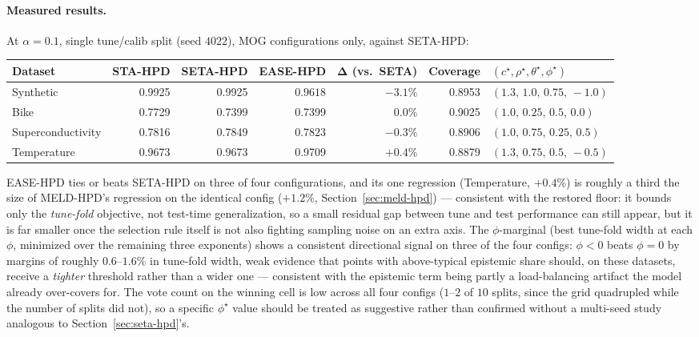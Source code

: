 \documentclass[11pt]{article}
\begin{document}
\paragraph{Measured results.} At $\alpha=0.1$, single tune/calib split (seed $4022$), MOG
configurations only, against SETA-HPD:

\begin{center}
\begin{tabular}{@{}lrrrrrl@{}}
\toprule
\textbf{Dataset} & \textbf{STA-HPD} & \textbf{SETA-HPD} & \textbf{EASE-HPD} & $\bm\Delta$ (vs.\
SETA) & Coverage & $(c^\star,\rho^\star,\theta^\star,\phi^\star)$ \\
\midrule
Synthetic          & 0.9925 & 0.9925 & $\bm{0.9618}$ & $\bm{-3.1\%}$ & 0.8953 & $(1.3,\,1.0,\,0.75,\,-1.0)$ \\
Bike               & 0.7729 & 0.7399 & 0.7399 & $0.0\%$ & 0.9025 & $(1.0,\,0.25,\,0.5,\,0.0)$ \\
Superconductivity  & 0.7816 & 0.7849 & $\bm{0.7823}$ & $\bm{-0.3\%}$ & 0.8906 & $(1.0,\,0.75,\,0.25,\,0.5)$ \\
Temperature        & 0.9673 & 0.9673 & 0.9709 & $+0.4\%$ & 0.8879 & $(1.3,\,0.75,\,0.5,\,-0.5)$ \\
\bottomrule
\end{tabular}
\end{center}

EASE-HPD ties or beats SETA-HPD on three of four configurations, and its one regression
(Temperature, $+0.4\%$) is roughly a third the size of MELD-HPD's regression on the identical
config ($+1.2\%$, Section~\ref{sec:meld-hpd}) --- consistent with the restored floor: it bounds
only the \emph{tune-fold} objective, not test-time generalization, so a small residual gap between
tune and test performance can still appear, but it is far smaller once the selection rule itself
is not also fighting sampling noise on an extra axis. The $\phi$-marginal (best tune-fold width at
each $\phi$, minimized over the remaining three exponents) shows a consistent directional signal
on three of the four configs: $\phi<0$ beats $\phi=0$ by margins of roughly $0.6$--$1.6\%$ in
tune-fold width, weak evidence that points with above-typical epistemic share should, on these
datasets, receive a \emph{tighter} threshold rather than a wider one --- consistent with the
epistemic term being partly a load-balancing artifact the model already over-covers for. The vote
count on the winning cell is low across all four configs ($1$--$2$ of $10$ splits, since the grid
quadrupled while the number of splits did not), so a specific $\phi^\star$ value should be treated
as suggestive rather than confirmed without a multi-seed study analogous to
Section~\ref{sec:seta-hpd}'s.
\end{document}
